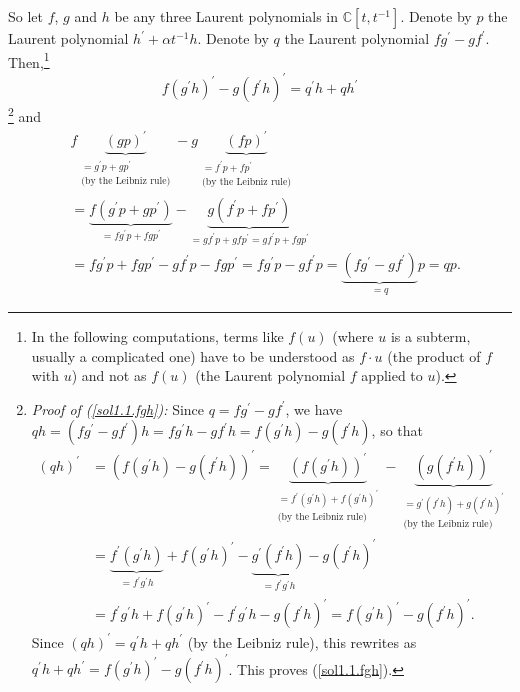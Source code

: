 \documentclass[etingof-lie.tex]{subfiles}
\begin{document}
So let $f$, $g$ and $h$ be any three Laurent polynomials in $\mathbb{C}\left[
t,t^{-1}\right]  $. Denote by $p$ the Laurent polynomial $h^{\prime}+\alpha
t^{-1}h$. Denote by $q$ the Laurent polynomial $fg^{\prime}-gf^{\prime}$.
Then,\footnote{In the following computations, terms like $f\left(  u\right)  $
(where $u$ is a subterm, usually a complicated one) have to be understood as
$f\cdot u$ (the product of $f$ with $u$) and not as $f\left(  u\right)  $ (the
Laurent polynomial $f$ applied to $u$).}%
\begin{equation}
f\left(  g^{\prime}h\right)  ^{\prime}-g\left(  f^{\prime}h\right)  ^{\prime
}=q^{\prime}h+qh^{\prime} \label{sol1.1.fgh}%
\end{equation}
\footnote{\textit{Proof of (\ref{sol1.1.fgh}):} Since $q=fg^{\prime
}-gf^{\prime}$, we have $qh=\left(  fg^{\prime}-gf^{\prime}\right)
h=fg^{\prime}h-gf^{\prime}h=f\left(  g^{\prime}h\right)  -g\left(  f^{\prime
}h\right)  $, so that%
\begin{align*}
\left(  qh\right)  ^{\prime}  &  =\left(  f\left(  g^{\prime}h\right)
-g\left(  f^{\prime}h\right)  \right)  ^{\prime}=\underbrace{\left(  f\left(
g^{\prime}h\right)  \right)  ^{\prime}}_{\substack{=f^{\prime}\left(
g^{\prime}h\right)  +f\left(  g^{\prime}h\right)  ^{\prime}\\\text{(by the
Leibniz rule)}}}-\underbrace{\left(  g\left(  f^{\prime}h\right)  \right)
^{\prime}}_{\substack{=g^{\prime}\left(  f^{\prime}h\right)  +g\left(
f^{\prime}h\right)  ^{\prime}\\\text{(by the Leibniz rule)}}}\\
&  =\underbrace{f^{\prime}\left(  g^{\prime}h\right)  }_{=f^{\prime}g^{\prime
}h}+f\left(  g^{\prime}h\right)  ^{\prime}-\underbrace{g^{\prime}\left(
f^{\prime}h\right)  }_{=f^{\prime}g^{\prime}h}-g\left(  f^{\prime}h\right)
^{\prime}\\
&  =f^{\prime}g^{\prime}h+f\left(  g^{\prime}h\right)  ^{\prime}-f^{\prime
}g^{\prime}h-g\left(  f^{\prime}h\right)  ^{\prime}=f\left(  g^{\prime
}h\right)  ^{\prime}-g\left(  f^{\prime}h\right)  ^{\prime}.
\end{align*}
Since $\left(  qh\right)  ^{\prime}=q^{\prime}h+qh^{\prime}$ (by the Leibniz
rule), this rewrites as $q^{\prime}h+qh^{\prime}=f\left(  g^{\prime}h\right)
^{\prime}-g\left(  f^{\prime}h\right)  ^{\prime}$. This proves
(\ref{sol1.1.fgh}).} and%
\begin{align}
&  f\underbrace{\left(  gp\right)  ^{\prime}}_{\substack{=g^{\prime
}p+gp^{\prime}\\\text{(by the Leibniz rule)}}}-g\underbrace{\left(  fp\right)
^{\prime}}_{\substack{=f^{\prime}p+fp^{\prime}\\\text{(by the Leibniz rule)}%
}}\nonumber\\
&  =\underbrace{f\left(  g^{\prime}p+gp^{\prime}\right)  }_{=fg^{\prime
}p+fgp^{\prime}}-\underbrace{g\left(  f^{\prime}p+fp^{\prime}\right)
}_{=gf^{\prime}p+gfp^{\prime}=gf^{\prime}p+fgp^{\prime}}\nonumber\\
&  =fg^{\prime}p+fgp^{\prime}-gf^{\prime}p-fgp^{\prime}=fg^{\prime
}p-gf^{\prime}p=\underbrace{\left(  fg^{\prime}-gf^{\prime}\right)  }%
_{=q}p=qp. \label{sol1.1.fgh2}%
\end{align}
\end{document}

